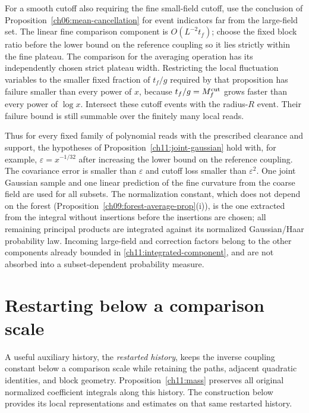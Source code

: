 For a smooth cutoff also requiring the fine small-field cutoff, use the
conclusion of Proposition~\ref{ch06:mean-cancellation} for event indicators far from the large-field set.
The linear fine comparison component is $O(L^{-2}t_f)$; choose the fixed
block ratio before the lower bound on the reference coupling so it lies strictly within
the fine plateau. The comparison for the averaging operation has its independently
chosen strict plateau width. Restricting the local fluctuation variables to the smaller
fixed fraction of $t_f/g$ required by that proposition has failure
smaller than every power of $x$, because $t_f/g=M_f^{\rm cut}$ grows
faster than every power of $\log x$. Intersect these cutoff events
with the radius-$R$ event. Their failure bound is still summable over
the finitely many local reads.

Thus for every fixed family of polynomial reads with the prescribed
clearance and support, the hypotheses of
Proposition~\ref{ch11:joint-gaussian} hold with, for example,
$\varepsilon=x^{-1/32}$ after increasing the lower bound on the reference coupling.
The covariance error is smaller than $\varepsilon$ and cutoff loss
smaller than $\varepsilon^2$. One joint Gaussian sample and one linear prediction of the fine
curvature from the coarse field are used for all subsets. The normalization constant, which does not depend on the forest (Proposition~\ref{ch09:forest-average-prop}(i)), is the one
extracted from the integral without insertions before the insertions are chosen; all
remaining principal products are integrated against its normalized
Gaussian/Haar probability law. Incoming large-field and correction
factors belong to the other components already bounded in
\eqref{ch11:integrated-component}, and are not absorbed into a
subset-dependent probability measure.

\section{Restarting below a comparison scale}

A useful auxiliary history, the \emph{restarted history}, keeps the inverse coupling constant below a
comparison scale while retaining the paths, adjacent quadratic identities,
and block geometry. Proposition~\ref{ch11:mass} preserves all original
normalized coefficient integrals along this history. The construction
below provides its local representations and estimates on that same
restarted history.


